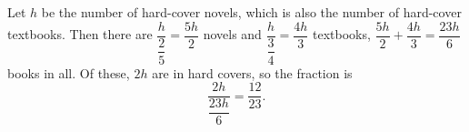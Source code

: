 Let $h$ be the number of hard-cover novels, which is also the number of hard-cover textbooks. Then there are $\dfrac{h}{\dfrac25}=\dfrac{5h}{2}$ novels and $\dfrac{h}{\dfrac34}=\dfrac{4h}{3}$ textbooks, $\dfrac{5h}{2}+\dfrac{4h}{3}=\dfrac{23h}{6}$ books in all. Of these, $2h$ are in hard covers, so the fraction is
\[\dfrac{2h}{\dfrac{23h}{6}}=\boxed{\dfrac{12}{23}}.\]

